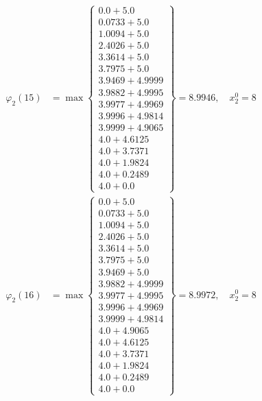 \documentclass{article}
\begin{document}
\begin{align*}
  
\varphi_{2}(15) &= \max \left\{ \begin{array}{c}
0.0 + 5.0 \\
 0.0733 + 5.0 \\
 1.0094 + 5.0 \\
 2.4026 + 5.0 \\
 3.3614 + 5.0 \\
 3.7975 + 5.0 \\
 3.9469 + 4.9999 \\
 3.9882 + 4.9995 \\
 3.9977 + 4.9969 \\
 3.9996 + 4.9814 \\
 3.9999 + 4.9065 \\
 4.0 + 4.6125 \\
 4.0 + 3.7371 \\
 4.0 + 1.9824 \\
 4.0 + 0.2489 \\
 4.0 + 0.0
\end{array} \right\}=8.9946,\quad x_{2}^0=8\\
  
  
  
  
\varphi_{2}(16) &= \max \left\{ \begin{array}{c}
0.0 + 5.0 \\
 0.0733 + 5.0 \\
 1.0094 + 5.0 \\
 2.4026 + 5.0 \\
 3.3614 + 5.0 \\
 3.7975 + 5.0 \\
 3.9469 + 5.0 \\
 3.9882 + 4.9999 \\
 3.9977 + 4.9995 \\
 3.9996 + 4.9969 \\
 3.9999 + 4.9814 \\
 4.0 + 4.9065 \\
 4.0 + 4.6125 \\
 4.0 + 3.7371 \\
 4.0 + 1.9824 \\
 4.0 + 0.2489 \\
 4.0 + 0.0
\end{array} \right\}=8.9972,\quad x_{2}^0=8\\
  
  
  

\end{align*}
\end{document}
